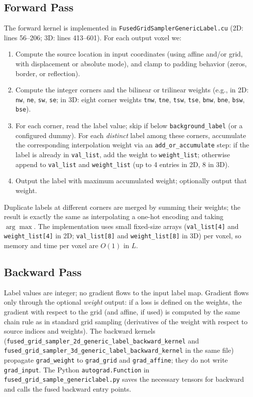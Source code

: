 \documentclass[11pt]{article}
\begin{document}
\subsection{Forward Pass}
The forward kernel is implemented in \texttt{FusedGridSamplerGenericLabel.cu} (2D: lines 56--206; 3D: lines 413--601). For each output voxel we:
\begin{enumerate}
\item Compute the source location in input coordinates (using affine and/or grid, with displacement or absolute mode), and clamp to padding behavior (zeros, border, or reflection).
\item Compute the integer corners and the bilinear or trilinear weights (e.g., in 2D: \texttt{nw}, \texttt{ne}, \texttt{sw}, \texttt{se}; in 3D: eight corner weights \texttt{tnw}, \texttt{tne}, \texttt{tsw}, \texttt{tse}, \texttt{bnw}, \texttt{bne}, \texttt{bsw}, \texttt{bse}).
\item For each corner, read the label value; skip if below \texttt{background\_label} (or a configured dummy). For each \emph{distinct} label among these corners, accumulate the corresponding interpolation weight via an \texttt{add\_or\_accumulate} step: if the label is already in \texttt{val\_list}, add the weight to \texttt{weight\_list}; otherwise append to \texttt{val\_list} and \texttt{weight\_list} (up to 4 entries in 2D, 8 in 3D).
\item Output the label with maximum accumulated weight; optionally output that weight.
\end{enumerate}
Duplicate labels at different corners are merged by summing their weights; the result is exactly the same as interpolating a one-hot encoding and taking $\arg\max$. The implementation uses small fixed-size arrays (\texttt{val\_list[4]} and \texttt{weight\_list[4]} in 2D; \texttt{val\_list[8]} and \texttt{weight\_list[8]} in 3D) per voxel, so memory and time per voxel are $O(1)$ in $L$.

\subsection{Backward Pass}
Label values are integer; no gradient flows to the input label map. Gradient flows only through the optional \emph{weight} output: if a loss is defined on the weights, the gradient with respect to the grid (and affine, if used) is computed by the same chain rule as in standard grid sampling (derivatives of the weight with respect to source indices and weights). The backward kernels (\texttt{fused\_grid\_sampler\_2d\_generic\_label\_backward\_kernel} and \texttt{fused\_grid\_sampler\_3d\_generic\_label\_backward\_kernel} in the same file) propagate \texttt{grad\_weight} to \texttt{grad\_grid} and \texttt{grad\_affine}; they do not write \texttt{grad\_input}. The Python \texttt{autograd.Function} in \texttt{fused\_grid\_sample\_genericlabel.py} saves the necessary tensors for backward and calls the fused backward entry points.
\end{document}
